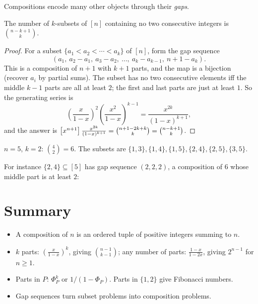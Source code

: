 Compositions encode many other objects through their \emph{gaps}.

\begin{theorem}
The number of $k$-subsets of $[n]$ containing no two consecutive integers is
$\binom{n-k+1}{k}$.
\end{theorem}
\begin{proof}
For a subset $\{a_1 < a_2 < \cdots < a_k\}$ of $[n]$, form the gap sequence
\[
(a_1,\ a_2 - a_1,\ a_3 - a_2,\ \dots,\ a_k - a_{k-1},\ n + 1 - a_k).
\]
This is a composition of $n+1$ with $k+1$ parts, and the map is a bijection (recover $a_i$ by
partial sums). The subset has no two consecutive elements iff the middle $k-1$ parts are all
at least $2$; the first and last parts are just at least $1$. So the generating series is
\[
\left(\frac{x}{1-x}\right)^2\left(\frac{x^2}{1-x}\right)^{k-1} = \frac{x^{2k}}{(1-x)^{k+1}},
\]
and the answer is $\left[x^{n+1}\right]\frac{x^{2k}}{(1-x)^{k+1}} = \binom{n+1-2k+k}{k} = \binom{n-k+1}{k}$.
\end{proof}

\begin{example}
$n = 5$, $k = 2$: $\binom{4}{2} = 6$. The subsets are $\{1,3\},\{1,4\},\{1,5\},\{2,4\},\{2,5\},
\{3,5\}$.
\end{example}

For instance $\{2,4\} \subseteq [5]$ has gap sequence $(2,2,2)$, a composition of $6$ whose middle
part is at least $2$:
\begin{center}
\end{center}

\section{Summary}
\begin{itemize}
  \item A composition of $n$ is an ordered tuple of positive integers summing to $n$.
  \item $k$ parts: $\left(\frac{x}{1-x}\right)^k$, giving $\binom{n-1}{k-1}$; any number of parts:
        $\frac{1-x}{1-2x}$, giving $2^{n-1}$ for $n \ge 1$.
  \item Parts in $P$: $\Phi_P^k$ or $1/(1 - \Phi_P)$. Parts in $\{1,2\}$ give Fibonacci numbers.
  \item Gap sequences turn subset problems into composition problems.
\end{itemize}
